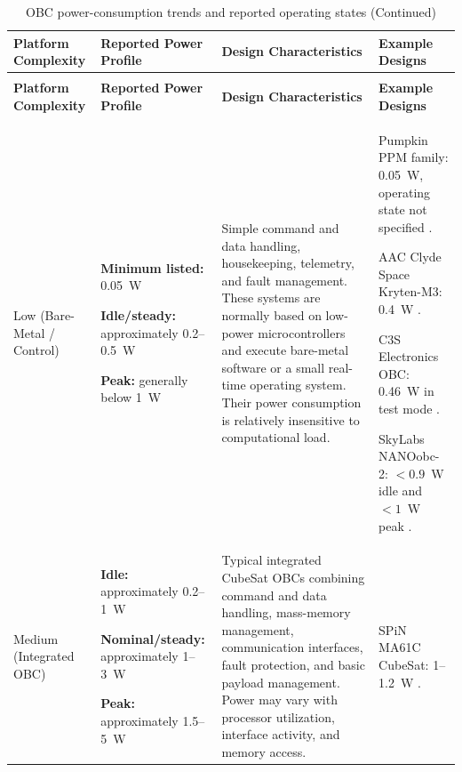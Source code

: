 \documentclass[10pt]{../datasheet}
\let\cite\citep
\begin{document}
\begin{longtable}{|p{2.7cm}|p{3.2cm}|p{5.0cm}|p{5.4cm}|}
  \caption{OBC power-consumption trends and reported operating states} \label{tab:power_trends} \\ \hline
  \textbf{Platform Complexity}
   &
  \textbf{Reported Power Profile}
   &
  \textbf{Design Characteristics}
   &
  \textbf{Example Designs}
  \\ \hline
  \endfirsthead
  \caption[]{OBC power-consumption trends and reported operating states (Continued)}            \\ \hline
  \textbf{Platform Complexity}
   &
  \textbf{Reported Power Profile}
   &
  \textbf{Design Characteristics}
   &
  \textbf{Example Designs}
  \\ \hline
  \endhead
  \hline
  \endfoot

  Low
  (Bare-Metal / Control)
   &
  \textbf{Minimum listed:} 0.05~W

  \textbf{Idle/steady:} approximately 0.2--0.5~W

  \textbf{Peak:} generally below 1~W
   &
  Simple command and data handling, housekeeping, telemetry, and fault
  management. These systems are normally based on low-power microcontrollers
  and execute bare-metal software or a small real-time operating system.
  Their power consumption is relatively insensitive to computational load.
   &
  Pumpkin PPM family:
  0.05~W, operating state not specified
  \cite[p.~231]{nasa_soa_2023}
  \cite[p.~235]{nasa_soa_2024}
  \cite[p.~233]{nasa_soa_2026}.

  AAC Clyde Space Kryten-M3:
  0.4~W
  \cite[p.~228]{nasa_soa_2023}
  \cite[p.~230]{nasa_soa_2024}
  \cite[Table~8-4]{nasa_soa_2026}.

  C3S Electronics OBC:
  0.46~W in test mode
  \cite[p.~229]{nasa_soa_2023}
  \cite[p.~232]{nasa_soa_2024}
  \cite[p.~230]{nasa_soa_2026}.

  SkyLabs NANOobc-2:
  $<0.9$~W idle and $<1$~W peak
  \cite[p.~232]{nasa_soa_2023}
  \cite[p.~236]{nasa_soa_2024}.
  \\ \hline

  Medium
  (Integrated OBC)
   &
  \textbf{Idle:} approximately 0.2--1~W

  \textbf{Nominal/steady:} approximately 1--3~W

  \textbf{Peak:} approximately 1.5--5~W
   &
  Typical integrated CubeSat OBCs combining command and data handling,
  mass-memory management, communication interfaces, fault protection, and
  basic payload management. Power may vary with processor utilization,
  interface activity, and memory access.
   &
  SPiN MA61C CubeSat:
  1--1.2~W
  \cite[p.~232]{nasa_soa_2023}
  \cite[p.~236]{nasa_soa_2024}
  \cite[Table~8-4]{nasa_soa_2026}.


\end{longtable}
\end{document}
